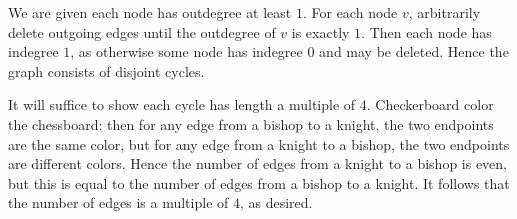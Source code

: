 We are given each node has outdegree at least $1$. For each node $v$, arbitrarily delete outgoing edges until the outdegree of $v$ is exactly $1$. Then each node has indegree $1$, as otherwise some node has indegree $0$ and may be deleted. Hence the graph consists of disjoint cycles.

It will suffice to show each cycle has length a multiple of $4$. Checkerboard color the chessboard: then for any edge from a bishop to a knight, the two endpoints are the same color, but for any edge from a knight to a bishop, the two endpoints are different colors. Hence the number of edges from a knight to a bishop is even, but this is equal to the number of edges from a bishop to a knight. It follows that the number of edges is a multiple of $4$, as desired.
